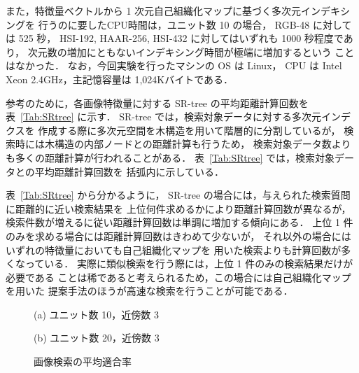 また，特徴量ベクトルから 1 次元自己組織化マップに基づく多次元インデキシングを
行うのに要したCPU時間は，ユニット数 10 の場合，
RGB-48 に対しては 525 秒，
HSI-192, HAAR-256, HSI-432 に対してはいずれも 1000 秒程度であり，
次元数の増加にともないインデキシング時間が極端に増加するという
ことはなかった．
なお，今回実験を行ったマシンの OS は Linux，
CPU は Intel Xeon 2.4GHz，主記憶容量は
1,024Kバイトである．


参考のために，各画像特徴量に対する SR-tree の平均距離計算回数を
表~\ref{Tab:SRtree} に示す．
SR-tree では，検索対象データに対する多次元インデクスを
作成する際に多次元空間を木構造を用いて階層的に分割しているが，
検索時には木構造の内部ノードとの距離計算も行うため，
検索対象データ数よりも多くの距離計算が行われることがある．
表~\ref{Tab:SRtree} では，検索対象データとの平均距離計算回数を
括弧内に示している．

表~\ref{Tab:SRtree} から分かるように，
SR-tree の場合には，与えられた検索質問に距離的に近い検索結果を
上位何件求めるかにより距離計算回数が異なるが，
検索件数が増えるに従い距離計算回数は単調に増加する傾向にある．
上位 1 件のみを求める場合には距離計算回数はきわめて少ないが，
それ以外の場合にはいずれの特徴量においても自己組織化マップを
用いた検索よりも計算回数が多くなっている．
実際に類似検索を行う際には，上位 1 件のみの検索結果だけが必要である
ことは稀であると考えられるため，この場合には自己組織化マップを用いた
提案手法のほうが高速な検索を行うことが可能である．

\begin{figure*}
\bigskip
\begin{center}
\begin{center}
(a) ユニット数 10，近傍数 3
\end{center}
\begin{center}
(b) ユニット数 20，近傍数 3
\end{center}
\end{center}
\caption{画像検索の平均適合率}
\label{Fig:ImageResults}
\end{figure*}

